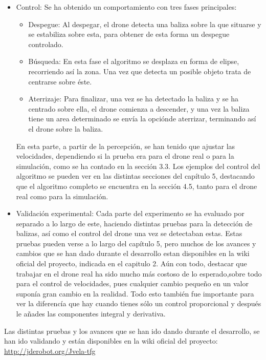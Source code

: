 \begin{itemize}
\item{Control:} Se ha obtenido un comportamiento con tres fases principales:
	\begin{itemize}
		\item{Despegue: } Al despegar, el drone detecta una baliza sobre la que situarse y se estabiliza sobre esta, para obtener de esta forma un despegue controlado.
		\item{B\'usqueda: } En esta fase el algoritmo se desplaza en forma de elipse, recorriendo as\'i la zona. Una vez que detecta un posible objeto trata de centrarse sobre \'este.
		\item{Aterrizaje: } Para finalizar, una vez se ha detectado la baliza y se ha centrado sobre ella, el drone comienza a descender, y una vez la baliza tiene un area determinado se env\'ia la opci\'onde aterrizar, terminando as\'i el drone sobre la baliza.
	\end{itemize}
	
	\hspace{1cm} En esta parte, a partir de la percepci\'on, se han tenido que ajustar las velocidades, dependiendo si la prueba era para el drone real o para la simulaci\'on, como se ha contado en la secci\'on 3.3. Los ejemplos del control del algoritmo se pueden ver en las distintas secciones del cap\'itulo 5, destacando que el algoritmo completo se encuentra en la secci\'on 4.5, tanto para el drone real como para la simulaci\'on. 

\item{Validaci\'on experimental:} Cada parte del experimento se ha evaluado por separado a lo largo de este, haciendo distintas pruebas para la detecci\'on de balizas, as\'i como el control del drone una vez se detectaban estas. Estas pruebas pueden verse a lo largo del cap\'itulo 5, pero muchos de los avances y cambios que se han dado durante el desarrollo estan disponibles en la wiki oficial del proyecto, indicada en el capitulo 2. A\'un con todo, destacar que trabajar en el drone real ha sido mucho m\'as costoso de lo esperado,sobre todo para el control de velocidades, pues cualquier cambio pequeño en un valor supon\'ia gran cambio en la realidad. Todo esto tambi\'en fue importante para ver la diferenc\'ia que hay cuando tienes s\'olo un control proporcional y despu\'es le añades las componentes integral y derivativa. 
		
\end{itemize}

\hspace{1cm} Las distintas pruebas y los avances que se han ido dando durante el desarrollo, se han ido validando y est\'an disponibles en la wiki oficial del proyecto:\\
\underline{\url{http://jderobot.org/Jvela-tfg}}

